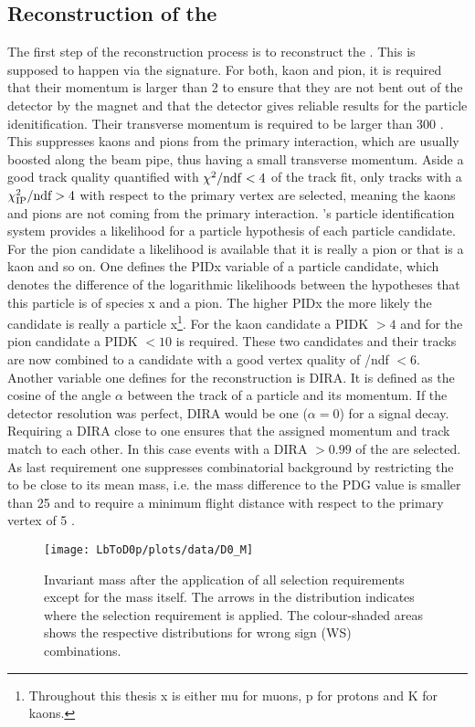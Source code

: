 \subsection{Reconstruction of the \Dz}
\label{sec:Selection_D0}
The first step of the reconstruction process is to reconstruct the \Dz.
This is supposed to happen via the \DToKpi signature.
For both, kaon and pion, it is required that their momentum is larger than 2 \gev to ensure that they are not bent out of the detector by the magnet and that the \rich detector gives reliable results for the particle idenitification.
Their transverse momentum is required to be larger than 300 \mev.
This suppresses kaons and pions from the primary interaction, which are usually boosted along the beam pipe, thus having a small transverse momentum.
Aside a good track quality quantified with $\chi^2/\mathrm{ndf} < 4$ of the track fit, only tracks with a $\chi^2_{\rm IP}/\text{ndf} > 4$  with respect to the primary vertex are selected, meaning the kaons and pions are not coming from the primary interaction.
\lhcb's particle identification system provides a likelihood for a particle hypothesis of each particle candidate.
For the pion candidate a likelihood is available that it is really a pion or that is a kaon and so on.
One defines the PIDx variable of a particle candidate, which denotes the difference of the logarithmic likelihoods between the hypotheses that this particle is of species x and a pion.
The higher PIDx the more likely the candidate is really a particle x\footnote{Throughout this thesis x is either mu for muons, p for protons and K for kaons.}.
For the kaon candidate a PIDK $>4$ and for the pion candidate a PIDK $<10$ is required.
These two candidates and their tracks are now combined to a \Dz candidate with a good vertex quality of \chisqvtx/ndf $<6$.
Another variable one defines for the reconstruction is DIRA.
It is defined as the cosine of the angle $\alpha$ between the track of a particle and its momentum.
If the detector resolution was perfect, DIRA would be one ($\alpha = 0$) for a signal decay.
Requiring a DIRA close to one ensures that the assigned momentum and track match to each other.
In this case events with a DIRA $>0.99$ of the \Dz are selected.
As last requirement one suppresses combinatorial background by restricting the \Dz to be close to its mean mass, i.e. the mass difference to the PDG value is smaller than 25 \mev and to require a minimum \Dz flight distance with respect to the primary vertex of 5 \mm.
\begin{figure}[hptb]
	\centering
	\texttt{[image: LbToD0p/plots/data/D0\_M]} \\
	\caption{Invariant \Dz mass after the application of all selection requirements except for the \Dz mass itself.
             The arrows in the \logIP distribution indicates where the selection requirement is applied.
             The colour-shaded areas shows the respective distributions for wrong sign (WS) combinations.}
	\label{fig:plot_mD0}
\end{figure}


